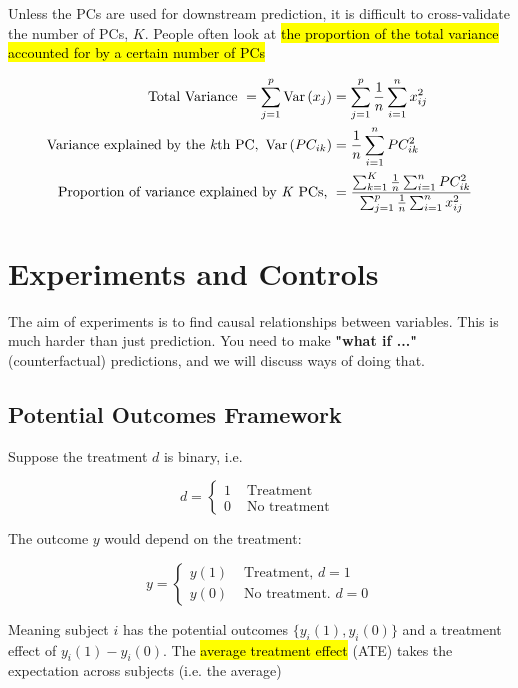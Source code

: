 \documentclass[11pt]{article}
\begin{document}
Unless the PCs are used for downstream prediction, it is difficult to cross-validate the number of PCs, $K$. People often look at \hl{the proportion of the total variance accounted for by a certain number of PCs}

\begin{align*}
    \text { Total Variance }=\sum_{j=1}^{p} \operatorname{Var}\left(x_{j}\right)&=\sum_{j=1}^{p} \frac{1}{n} \sum_{i=1}^{n} x_{i j}^{2} \\
    \text{Variance explained by the \textit{k}th PC, }\operatorname{Var}\left(P C_{i k}\right)&=\frac{1}{n} \sum_{i=1}^{n} PC_{i k}^{2} \\
    \text{Proportion of variance explained by \textit{K} PCs, }&=\frac{\sum_{k=1}^{K} \frac{1}{n} \sum_{i=1}^{n} P C_{i k}^{2}}{\sum_{j=1}^{p} \frac{1}{n} \sum_{i=1}^{n} x_{i j}^{2}}
\end{align*}

\newpage
\section{Experiments and Controls}

The aim of experiments is to find causal relationships between variables. This is much harder than just prediction. You need to make \textbf{"what if ..."} (counterfactual) predictions, and we will discuss ways of doing that.

\subsection{Potential Outcomes Framework}

Suppose the treatment $d$ is binary, i.e.

$$
d= \begin{cases}1 & \text { Treatment } \\ 0 & \text { No treatment }\end{cases}
$$

The outcome $y$ would depend on the treatment:

$$
y= \begin{cases}y(1) & \text { Treatment, } d=1 \\ y(0) & \text { No treatment. } d=0\end{cases}
$$

Meaning subject $i$ has the potential outcomes $\{y_i(1), y_i(0)\}$ and a treatment effect of $y_i(1) - y_i(0)$. The \hl{average treatment effect} (ATE) takes the expectation across subjects (i.e. the average)
\end{document}
